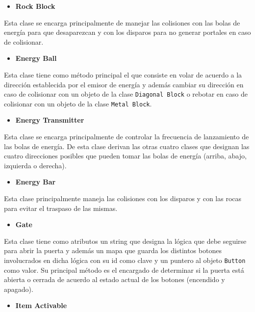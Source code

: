 \documentclass[a4paper]{article}
\begin{document}
\begin{itemize}
	\item \textbf{Rock Block}
\end{itemize}

Esta clase se encarga principalmente de manejar las colisiones con las bolas de energía para que desaparezcan y con los disparos para no generar portales en caso de colisionar.

\begin{itemize}
	\item \textbf{Energy Ball}
\end{itemize}

Esta clase tiene como método principal el que consiste en volar de acuerdo a la dirección establecida por el emisor de energía y además cambiar su dirección en caso de colisionar con un objeto de la clase \texttt{Diagonal Block} o rebotar en caso de colisionar con un objeto de la clase \texttt{Metal Block}.

\begin{itemize}
	\item \textbf{Energy Transmitter}
\end{itemize}

Esta clase se encarga principalmente de controlar la frecuencia de lanzamiento de las bolas de energía. De esta clase derivan las otras cuatro clases que designan las cuatro direcciones posibles que pueden tomar las bolas de energía (arriba, abajo, izquierda o derecha).

\begin{itemize}
	\item \textbf{Energy Bar}
\end{itemize}

Esta clase principalmente maneja las colisiones con los disparos y con las rocas para evitar el traspaso de las mismas.


\begin{itemize}
	\item \textbf{Gate}
\end{itemize}

Esta clase tiene como atributos un string que designa la lógica que debe seguirse para abrir la puerta y además un mapa que guarda los distintos botones involucrados en dicha lógica con su id como clave y un puntero al objeto \texttt{Button} como valor. Su principal método es el encargado de determinar si la puerta está abierta o cerrada de acuerdo al estado actual de los botones (encendido y apagado).

\begin{itemize}
	\item \textbf{Item Activable}
\end{itemize}
\end{document}
